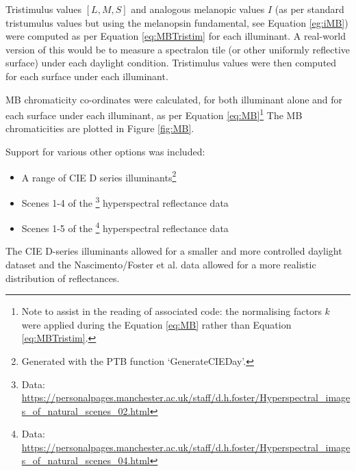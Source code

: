 Tristimulus values $[L,M,S]$ and analogous melanopic values $I$ (as per standard tristumulus values but using the melanopsin fundamental, see Equation \ref{eg:iMB}) were computed as per Equation \ref{eq:MBTristim} for each illuminant. A real-world version of this would be to measure a spectralon tile (or other uniformly reflective surface) under each daylight condition. Tristimulus values were then computed for each surface under each illuminant.

\gls{MB} chromaticity co-ordinates were calculated, for both illuminant alone and for each surface under each illuminant, as per Equation \ref{eq:MB}\footnote{Note to assist in the reading of associated code: the normalising factors $k$ were applied during the Equation \ref{eq:MB} rather than Equation \ref{eq:MBTristim}.} The \gls{MB} chromaticities are plotted in Figure \ref{fig:MB}. 

\bigskip
\noindent
Support for various other options was included:
\begin{itemize}
    \item A range of CIE D series illuminants\footnote{Generated with the \gls{PTB} function `GenerateCIEDay'.}
    \item Scenes 1-4 of the
\citet{nascimento_statistics_2002}\footnote{Data: \url{https://personalpages.manchester.ac.uk/staff/d.h.foster/Hyperspectral_images_of_natural_scenes_02.html}} hyperspectral reflectance data
    \item Scenes 1-5 of the 
\citet{foster_frequency_2006}\footnote{Data: \url{https://personalpages.manchester.ac.uk/staff/d.h.foster/Hyperspectral_images_of_natural_scenes_04.html}}
hyperspectral reflectance data
\end{itemize}

The CIE D-series illuminants allowed for a smaller and more controlled daylight dataset and the Nascimento/Foster et al. data allowed for a more realistic distribution of reflectances.

